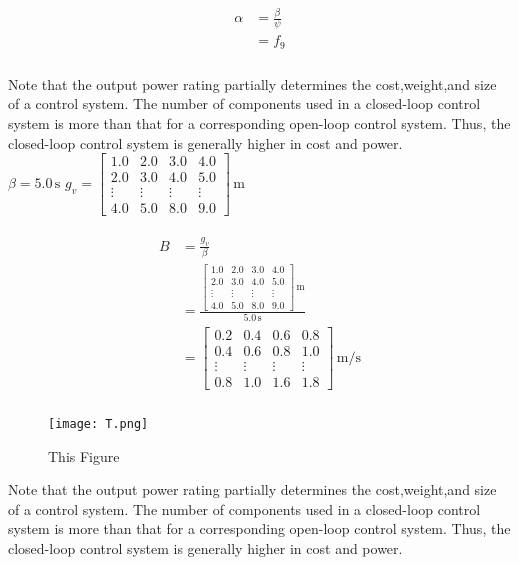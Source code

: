 \documentclass[12pt]{report}
\begin{document}
\begin{align}
\begin{split}
\alpha &= \frac{\beta}{\psi}\\
 &= f_{9}\\
\end{split}
\end{align}

Note that the  output power rating partially determines the cost,weight,and size of a control system.  The number of components used in a closed-loop control system is more than that for  a corresponding open-loop control system. Thus, the closed-loop control system is  generally higher in cost and power.\\
 $\beta = 5.0\,\mathrm{s}$ 
 $g_{v} = \left[\begin{matrix}1.0 & 2.0 & 3.0 & 4.0\\2.0 & 3.0 & 4.0 & 5.0\\\vdots & \vdots & \vdots & \vdots\\4.0 & 5.0 & 8.0 & 9.0\end{matrix}\right]\,\mathrm{m}$ 

\begin{align}
\begin{split}
B	&= \frac{g_{v}}{\beta}\\
	&= \frac{\left[\begin{matrix}1.0 & 2.0 & 3.0 & 4.0\\2.0 & 3.0 & 4.0 & 5.0\\\vdots & \vdots & \vdots & \vdots\\4.0 & 5.0 & 8.0 & 9.0\end{matrix}\right]\,\mathrm{m}}{5.0\,\mathrm{s}}\\
	&= \left[\begin{matrix}0.2 & 0.4 & 0.6 & 0.8\\0.4 & 0.6 & 0.8 & 1.0\\\vdots & \vdots & \vdots & \vdots\\0.8 & 1.0 & 1.6 & 1.8\end{matrix}\right]\,\mathrm{{m}\slash{s}}\\
\end{split}
\end{align}

\begin{figure}
\centering
\texttt{[image: T.png]}
\caption{This Figure}
\label{T}
\end{figure}

Note that the  output power rating partially determines the cost,weight,and size of a control system.  The number of components used in a closed-loop control system is more than that for  a corresponding open-loop control system. Thus, the closed-loop control system is generally higher in cost and power.
\end{document}
